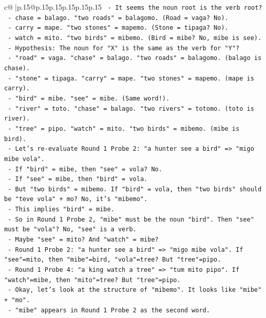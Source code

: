 \documentclass{article}
\begin{document}
{\begin{supertabular}{c@{$\;$}|p{.15\linewidth}@{}p{.15\linewidth}p{.15\linewidth}p{.15\linewidth}p{.15\linewidth}p{.15\linewidth}}
{{{\texttt{    {-} It seems the noun root is the verb root?} \\
\texttt{      {-} chase = balago. "two roads" = balagomo. (Road = vaga? No).} \\
\texttt{      {-} carry = mape. "two stones" = mapemo. (Stone = tipaga? No).} \\
\texttt{      {-} watch = mito. "two birds" = mibemo. (Bird = mibe? No, mibe is see).} \\
\texttt{  {-} Hypothesis: The noun for "X" is the same as the verb for "Y"?} \\
\texttt{    {-} "road" = vaga. "chase" = balago. "two roads" = balagomo. (balago is chase).} \\
\texttt{    {-} "stone" = tipaga. "carry" = mape. "two stones" = mapemo. (mape is carry).} \\
\texttt{    {-} "bird" = mibe. "see" = mibe. (Same word!).} \\
\texttt{    {-} "river" = toto. "chase" = balago. "two rivers" = totomo. (toto is river).} \\
\texttt{    {-} "tree" = pipo. "watch" = mito. "two birds" = mibemo. (mibe is bird).} \\
\texttt{  {-} Let's re{-}evaluate Round 1 Probe 2: "a hunter see a bird" => "migo mibe vola".} \\
\texttt{    {-} If "bird" = mibe, then "see" = vola? No.} \\
\texttt{    {-} If "see" = mibe, then "bird" = vola.} \\
\texttt{    {-} But "two birds" = mibemo. If "bird" = vola, then "two birds" should be "teve vola" + mo? No, it's "mibemo".} \\
\texttt{    {-} This implies "bird" = mibe.} \\
\texttt{    {-} So in Round 1 Probe 2, "mibe" must be the noun "bird". Then "see" must be "vola"? No, "see" is a verb.} \\
\texttt{    {-} Maybe "see" = mito? And "watch" = mibe?} \\
\texttt{      {-} Round 1 Probe 2: "a hunter see a bird" => "migo mibe vola". If "see"=mito, then "mibe"=bird, "vola"=tree? But "tree"=pipo.} \\
\texttt{      {-} Round 1 Probe 4: "a king watch a tree" => "tum mito pipo". If "watch"=mibe, then "mito"=tree? But "tree"=pipo.} \\
\texttt{  {-} Okay, let's look at the structure of "mibemo". It looks like "mibe" + "mo".} \\
\texttt{  {-} "mibe" appears in Round 1 Probe 2 as the second word.} \\
}}}
\end{supertabular}}
\end{document}
